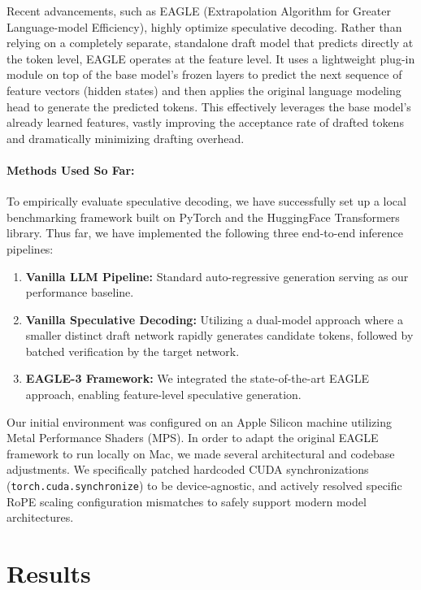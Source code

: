 \documentclass[11pt]{article}
\begin{document}
Recent advancements, such as EAGLE (Extrapolation Algorithm for Greater Language-model Efficiency), highly optimize speculative decoding. Rather than relying on a completely separate, standalone draft model that predicts directly at the token level, EAGLE operates at the feature level. It uses a lightweight plug-in module on top of the base model's frozen layers to predict the next sequence of feature vectors (hidden states) and then applies the original language modeling head to generate the predicted tokens. This effectively leverages the base model's already learned features, vastly improving the acceptance rate of drafted tokens and dramatically minimizing drafting overhead.

\paragraph{Methods Used So Far:}
To empirically evaluate speculative decoding, we have successfully set up a local benchmarking framework built on PyTorch and the HuggingFace Transformers library. Thus far, we have implemented the following three end-to-end inference pipelines:
\begin{enumerate}
    \item \textbf{Vanilla LLM Pipeline:} Standard auto-regressive generation serving as our performance baseline.
    \item \textbf{Vanilla Speculative Decoding:} Utilizing a dual-model approach where a smaller distinct draft network rapidly generates candidate tokens, followed by batched verification by the target network.
    \item \textbf{EAGLE-3 Framework:} We integrated the state-of-the-art EAGLE approach, enabling feature-level speculative generation.
\end{enumerate}

Our initial environment was configured on an Apple Silicon machine utilizing Metal Performance Shaders (MPS). In order to adapt the original EAGLE framework to run locally on Mac, we made several architectural and codebase adjustments. We specifically patched hardcoded CUDA synchronizations (\texttt{torch.cuda.synchronize}) to be device-agnostic, and actively resolved specific RoPE scaling configuration mismatches to safely support modern model architectures.

\section{Results}
\end{document}
